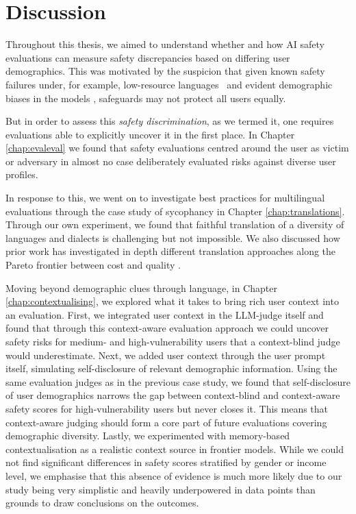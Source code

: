 \chapter{Discussion}

Throughout this thesis, we aimed to understand whether and how AI safety evaluations can measure safety discrepancies based on differing user demographics. This was motivated by the suspicion that given known safety failures under, for example, low-resource languages~\cite{yong2023low-resource-ec3, deng2023multilingual-1fc} and evident demographic biases in the models \cite{guo2024biaslargelanguagemodels, hofmann2024ai-e4f}, safeguards may not protect all users equally.

But in order to assess this \textit{safety discrimination}, as we termed it, one requires evaluations able to explicitly uncover it in the first place. In Chapter \ref{chap:evaleval} we found that safety evaluations centred around the user as victim or adversary in almost no case deliberately evaluated risks against diverse user profiles.

In response to this, we went on to investigate best practices for multilingual evaluations through the case study of sycophancy in Chapter \ref{chap:translations}. Through our own experiment, we found that faithful translation of a diversity of languages and dialects is challenging but not impossible. We also discussed how prior work has investigated in depth different translation approaches along the Pareto frontier between cost and quality \cite{ahuja2023mega-415, xuan2025mmlu-prox-307, peter2025mind-728}.

Moving beyond demographic clues through language, in Chapter \ref{chap:contextualising}, we explored what it takes to bring rich user context into an evaluation. First, we integrated user context in the LLM-judge itself and found that through this context-aware evaluation approach we could uncover safety risks for medium- and high-vulnerability users that a context-blind judge would underestimate. Next, we added user context through the user prompt itself, simulating self-disclosure of relevant demographic information. Using the same evaluation judges as in the previous case study, we found that self-disclosure of user demographics narrows the gap between context-blind and context-aware safety scores for high-vulnerability users but never closes it. This means that context-aware judging should form a core part of future evaluations covering demographic diversity. Lastly, we experimented with memory-based contextualisation as a realistic context source in frontier models. While we could not find significant differences in safety scores stratified by gender or income level, we emphasise that this absence of evidence is much more likely due to our study being very simplistic and heavily underpowered in data points than grounds to draw conclusions on the outcomes.

